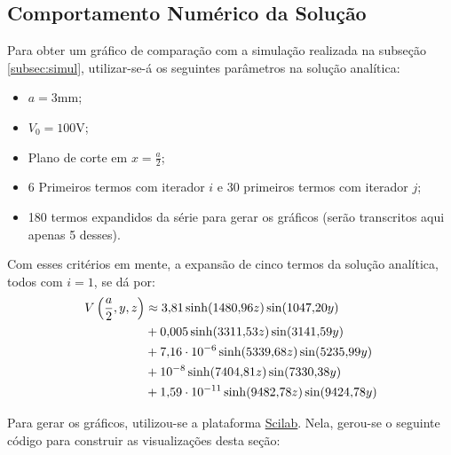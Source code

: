 \documentclass{report}
\begin{document}
\subsection{Comportamento Numérico da Solução}

Para obter um gráfico de comparação com a simulação realizada na subseção \ref{subsec:simul}, utilizar-se-á os seguintes parâmetros na solução analítica:

\begin{itemize}
  \item $ a = 3 \text{mm}$;
  \item $ V_0 = 100 \text{V}$;
  \item Plano de corte em $ x = \frac{a}{2} $;
  \item 6 Primeiros termos com iterador $ i $ e 30 primeiros termos com iterador $ j $;
  \item 180 termos expandidos da série para gerar os gráficos (serão transcritos aqui apenas 5 desses).
\end{itemize}

Com esses critérios em mente, a expansão de cinco termos da solução analítica, todos com $ i = 1 $, se dá por:
\begin{equation}
  \label{eq:numerical_solution_expanded}
  \centering
  \begin{aligned}
    V\left(\frac{a}{2},y,z\right) &\approx 3,\!81\sinh(1480,\!96z)\sin(1047,\!20y) \\
                                  &+ 0,\!005\sinh(3311,\!53z)\sin(3141,\!59y) \\
                                  &+ 7,\!16\cdot 10^{-6} \sinh(5339,\!68z)\sin(5235,\!99y) \\
                                  &+ 10^{-8} \sinh(7404,\!81z) \sin(7330,\!38y) \\
                                  &+ 1,\!59\cdot 10^{-11} \sinh(9482,\!78z) \sin(9424,\!78y)
  \end{aligned}
\end{equation}

Para gerar os gráficos, utilizou-se a plataforma \href{https://www.scilab.org/download/scilab-2024.1.0}{Scilab}. Nela, gerou-se o seguinte código
para construir as visualizações desta seção:


\end{document}
